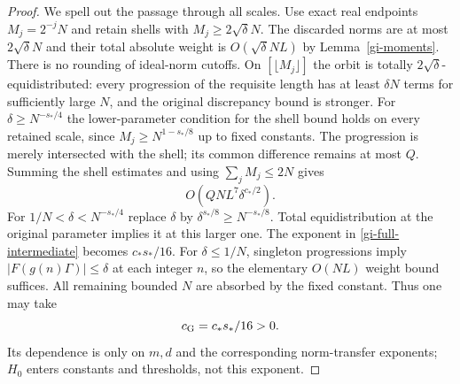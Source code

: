 \begin{proof}
We spell out the passage through all scales.  Use exact real endpoints
$M_j=2^{-j}N$ and retain shells with $M_j\geq2\sqrt\delta N$.
The discarded norms are at most $2\sqrt\delta N$ and their total
absolute weight is $O(\sqrt\delta NL)$ by Lemma~\ref{gi-moments}.
There is no rounding of ideal-norm cutoffs.  On $[\lfloor M_j\rfloor]$
the orbit is totally $2\sqrt\delta$-equidistributed: every progression
of the requisite length has at least $\delta N$ terms for sufficiently
large $N$, and the original discrepancy bound is stronger.
For $\delta\geq N^{-s_*/4}$ the lower-parameter condition for the shell
bound holds on every retained scale, since
$M_j\geq N^{1-s_*/8}$ up to fixed constants.  The progression is merely
intersected with the shell; its common difference remains at most $Q$.
Summing the shell estimates and using $\sum_jM_j\leq2N$ gives
\begin{equation}\label{gi-full-intermediate}
                  O(QNL^7\delta^{c_*/2}).
\end{equation}
For $1/N<\delta<N^{-s_*/4}$ replace $\delta$ by
$\delta^{s_*/8}\geq N^{-s_*/8}$.  Total equidistribution at the
original parameter implies it at this larger one.  The exponent in
\eqref{gi-full-intermediate} becomes $c_*s_*/16$.
For $\delta\leq1/N$, singleton progressions imply
$|F(g(n)\Gamma)|\leq\delta$ at each integer $n$, so the elementary
$O(NL)$ weight bound suffices.  All remaining bounded $N$ are absorbed
by the fixed constant.  Thus one may take
\begin{equation}\label{gi-final-exponent}
                         c_{\rm G}=c_*s_*/16>0.
\end{equation}
Its dependence is only on $m,d$ and the corresponding norm-transfer
exponents; $H_0$ enters constants and thresholds, not this exponent.
\end{proof}

